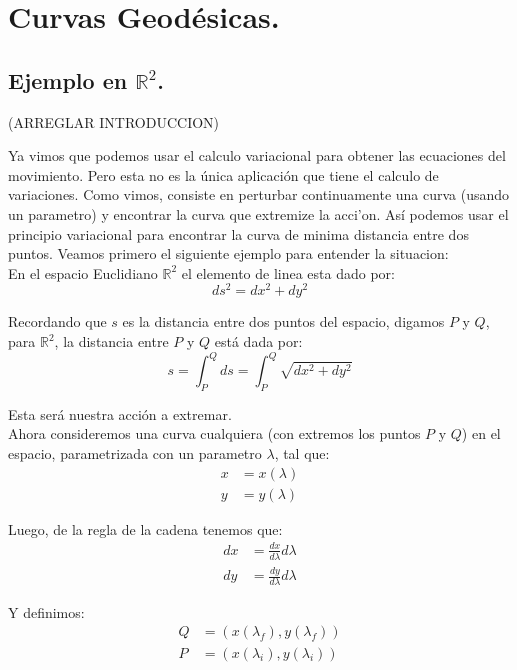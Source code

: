 \documentclass[paper=a4, fontsize=11pt,twoside]{scrartcl}
\begin{document}
\section{Curvas Geod\'esicas.}

\subsection{Ejemplo en $\mathbb{R}^{2}$.}

(ARREGLAR INTRODUCCION)

Ya vimos que podemos usar el calculo variacional para obtener las ecuaciones del movimiento. Pero esta no es la \'unica aplicaci\'on que 
tiene el calculo de variaciones. Como vimos, consiste en perturbar continuamente una curva (usando un parametro) y encontrar la curva que 
extremize la acci'on. As\'i podemos usar el principio variacional para encontrar la curva de minima distancia entre dos puntos. Veamos 
primero el siguiente ejemplo para entender la situacion: \\

En el espacio Euclidiano $\mathbb{R}^{2}$ el elemento de linea esta dado por:
	\begin{equation*}
		ds^{2} = dx^{2} + dy^{2}
	\end{equation*}

Recordando que $s$ es la distancia entre dos puntos del espacio, digamos $P$ y $Q$, para $\mathbb{R}^{2}$, la distancia entre 
$P$ y $Q$ est\'a dada por:
	\begin{equation*}
		s = \int^{Q}_{P} ds = \int^{Q}_{P} \sqrt{dx^{2} + dy^{2}}
	\end{equation*}

Esta ser\'a nuestra acci\'on a extremar. \\

Ahora consideremos una curva cualquiera (con extremos los puntos $P$ y $Q$) en el espacio, parametrizada con un parametro 
$\lambda$, tal que:
	\begin{align*}
		x &= x \left( \lambda \right) \\
		y &= y \left( \lambda \right)
	\end{align*}

Luego, de la regla de la cadena tenemos que:
	\begin{align*}
		dx &= \frac{dx}{d\lambda} d\lambda \\
		dy &= \frac{dy}{d\lambda} d\lambda
	\end{align*}
	
Y definimos:
	\begin{align*}
		Q &= \left( x \left(\lambda_{f} \right) , y \left(\lambda_{f} \right) \right) \\
		P &= \left( x \left(\lambda_{i} \right) , y \left(\lambda_{i} \right) \right)
	\end{align*}
	
\end{document}
